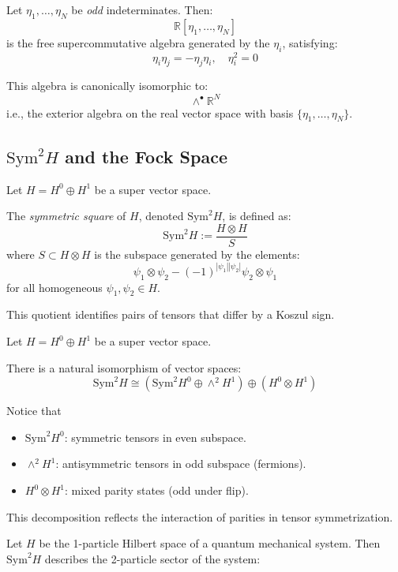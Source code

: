 \begin{example}
    Let $\eta_1, \dots, \eta_N$ be \emph{odd} indeterminates. Then:
\[
\mathbb{R}[\eta_1, \dots, \eta_N]
\]
is the free supercommutative algebra generated by the $\eta_i$, satisfying:
\[
\eta_i \eta_j = -\eta_j \eta_i, \quad \eta_i^2 = 0
\]

\vspace{0.5em}
This algebra is canonically isomorphic to:
\[
\wedge^\bullet \mathbb{R}^N
\]
i.e., the exterior algebra on the real vector space with basis $\{ \eta_1, \dots, \eta_N \}$.
\end{example}

\subsection{$\text{Sym}^2 H$ and the Fock Space}

Let $H = H^0 \oplus H^1$ be a super vector space.

The \emph{symmetric square} of $H$, denoted $\mathrm{Sym}^2 H$, is defined as:
\[
\mathrm{Sym}^2 H := \frac{H \otimes H}{S}
\]
where $S \subset H \otimes H$ is the subspace generated by the elements:
\[
\psi_1 \otimes \psi_2 - (-1)^{|\psi_1||\psi_2|} \psi_2 \otimes \psi_1
\]
for all homogeneous $\psi_1, \psi_2 \in H$.

This quotient identifies pairs of tensors that differ by a Koszul sign.


Let $H = H^0 \oplus H^1$ be a super vector space.
\begin{lemma}
There is a natural isomorphism of vector spaces:
\[
\mathrm{Sym}^2 H \cong 
\left( \mathrm{Sym}^2 H^0 \oplus \wedge^2 H^1 \right)
\oplus \left( H^0 \otimes H^1 \right)
\]
\end{lemma}
Notice that
\begin{itemize}
    \item $\mathrm{Sym}^2 H^0$: symmetric tensors in even subspace.
    \item $\wedge^2 H^1$: antisymmetric tensors in odd subspace (fermions).
    \item $H^0 \otimes H^1$: mixed parity states (odd under flip).
\end{itemize}
This decomposition reflects the interaction of parities in tensor symmetrization.


Let $H$ be the 1-particle Hilbert space of a quantum mechanical system. Then $\mathrm{Sym}^2 H$ describes the 2-particle sector of the system:

